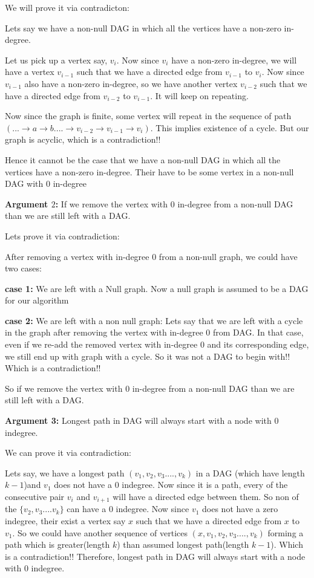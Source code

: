 \documentclass[answers]{exam}
\begin{document}
\begin{questions}
\begin{solution}
We will prove it via contradicton:

Lets say we have a non-null DAG in which all the vertices have a non-zero in-degree.\par
Let us pick up a vertex say, $v_i$. Now since $v_i$ have a non-zero in-degree, we will have a vertex $v_{i-1}$ such that we have a directed edge from $v_{i-1}$ to $v_i$. Now since $v_{i-1}$ also have a non-zero in-degree, so we have another vertex $v_{i-2}$ such that we have a directed edge from $v_{i-2}$ to $v_{i-1}$. It will keep on repeating. \par Now since the graph is finite, some vertex will repeat in the sequence of path $(...\rightarrow a\rightarrow b....\rightarrow v_{i-2}\rightarrow v_{i-1}\rightarrow v_{i})$. This implies existence of a cycle. But our graph is acyclic, which is a contradiction!!

Hence it cannot be the case that we have a non-null DAG in which all the vertices have a non-zero in-degree. Their have to be some vertex in a non-null DAG with $0$ in-degree \par

\textbf{Argument $2$:} If we remove the vertex with $0$ in-degree from a non-null DAG than we are still left with a DAG.\par

Lets prove it via contradiction:\par
After removing a vertex with in-degree $0$ from a non-null graph, we could have two cases:\par
\textbf{case 1: }We are left with a Null graph. Now a null graph is assumed to be a DAG for our algorithm\par
\textbf{case 2: }We are left with a non null graph: Lets say that we are left with a cycle in the graph after removing the vertex with in-degree $0$ from DAG. In that case, even if we re-add the removed vertex with in-degree $0$ and its corresponding edge, we still end up with graph with a cycle. So it was not a DAG to begin with!! Which is a contradiction!! 

So if we remove the vertex with $0$ in-degree from a non-null DAG than we are still left with a DAG.\par


\textbf{Argument 3:} Longest path in DAG will always start with a node with $0$ indegree.

We can prove it via contradiction:

Lets say, we have a longest path $(v_1,v_2,v_3....,v_k)$ in a DAG (which have length $k-1$)and $v_1$ does not have a $0$ indegree. 
Now since it is a path, every of the consecutive pair $v_i$ and $v_{i+1}$ will have a directed edge between them. So non of the $\{v_2,v_3....v_k\}$ can have a $0$ indegree.
Now since $v_1$ does not have a zero indegree, their exist a vertex say $x$ such that we have a directed edge from $x$ to $v_1$. So we could have another sequence of vertices $(x,v_1,v_2,v_3....,v_k)$ forming a path which is greater(length $k$) than assumed longest path(length $k-1$). Which is a contradiction!! Therefore, longest path in DAG will always start with a node with $0$ indegree.


\end{solution}
\end{questions}
\end{document}
